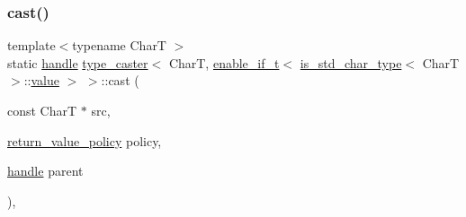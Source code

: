 \subsubsection{\texorpdfstring{cast()}{cast()}\hspace{0.1cm}{\footnotesize\ttfamily [1/2]}}
{\footnotesize\ttfamily template$<$typename CharT $>$ \\
static \mbox{\hyperlink{classhandle}{handle}} \mbox{\hyperlink{classtype__caster}{type\+\_\+caster}}$<$ CharT, \mbox{\hyperlink{detail_2common_8h_a012819c9e8b5e04872a271f50f8b8196}{enable\+\_\+if\+\_\+t}}$<$ \mbox{\hyperlink{cast_8h_a0ee0eaf3d12f9b0e472ed620777ba3c3}{is\+\_\+std\+\_\+char\+\_\+type}}$<$ CharT $>$\+::\mbox{\hyperlink{_s_d_l__opengl__glext_8h_a8ad81492d410ff2ac11f754f4042150f}{value}} $>$ $>$\+::cast (\begin{DoxyParamCaption}\item[{const CharT $\ast$}]{src,  }\item[{\mbox{\hyperlink{detail_2common_8h_adde72ab1fb0dd4b48a5232c349a53841}{return\+\_\+value\+\_\+policy}}}]{policy,  }\item[{\mbox{\hyperlink{classhandle}{handle}}}]{parent }\end{DoxyParamCaption})\hspace{0.3cm}{\ttfamily [inline]}, {\ttfamily [static]}}

\mbox{\label{structtype__caster_3_01_char_t_00_01enable__if__t_3_01is__std__char__type_3_01_char_t_01_4_1_1value_01_4_01_4_a8b90e52758f59f04af295d84b7ab6ba0}} 
